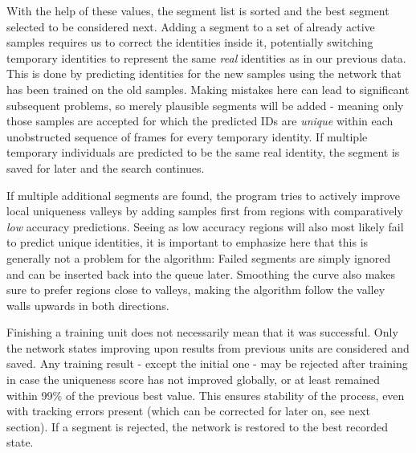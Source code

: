 \documentclass[9pt,lineno]{elife}
\begin{document}
With the help of these values, the segment list is sorted and the best segment selected to be considered next. Adding a segment to a set of already active samples requires us to correct the identities inside it, potentially switching temporary identities to represent the same \textit{real} identities as in our previous data. This is done by predicting identities for the new samples using the network that has been trained on the old samples. Making mistakes here can lead to significant subsequent problems, so merely plausible segments will be added - meaning only those samples are accepted for which the predicted IDs are \textit{unique} within each unobstructed sequence of frames for every temporary identity. If multiple temporary individuals are predicted to be the same real identity, the segment is saved for later and the search continues.

If multiple additional segments are found, the program tries to actively improve local uniqueness valleys by adding samples first from regions with comparatively \textit{low} accuracy predictions. Seeing as low accuracy regions will also most likely fail to predict unique identities, it is important to emphasize here that this is generally not a problem for the algorithm: Failed segments are simply ignored and can be inserted back into the queue later. Smoothing the curve also makes sure to prefer regions close to valleys, making the algorithm follow the valley walls upwards in both directions.


Finishing a training unit does not necessarily mean that it was successful. Only the network states improving upon results from previous units are considered and saved. Any training result - except the initial one - may be rejected after training in case the uniqueness score has not improved globally, or at least remained within 99\% of the previous best value. This ensures stability of the process, even with tracking errors present (which can be corrected for later on, see next section). If a segment is rejected, the network is restored to the best recorded state.

\end{document}
